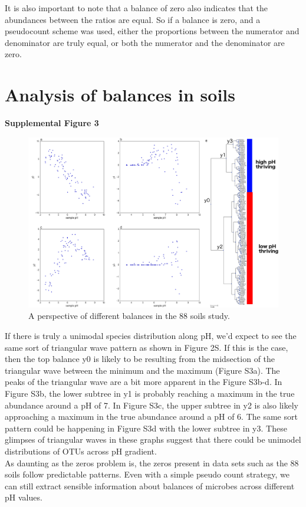 It is also important to note that a balance of zero also indicates that the abundances between the ratios are equal.  So if a balance is zero, and a pseudocount scheme was used, either the proportions between the numerator and denominator are truly equal, or both the numerator and the denominator are zero.\newpage
\section{Analysis of balances in soils}
\textbf{Supplemental Figure 3}\\[5 mm]
\begin{figure}[H]
        \centering
        \includegraphics[width=1\textwidth]{appendix_b/sup_figure3.png}
        \caption[Other balances from the 88 soils study.]{A perspective of different balances in the 88 soils study.}
        \label{figbS3}
\end{figure}
If there is truly a unimodal species distribution along pH, we’d expect to see the same sort of triangular wave pattern as shown in Figure 2S.  If this is the case, then the top balance y0 is likely to be resulting from the midsection of the triangular wave between the minimum and the maximum (Figure S3a).  The peaks of the triangular wave are a bit more apparent in the Figure S3b-d.  In Figure S3b, the lower subtree in y1 is probably reaching a maximum in the true abundance around a pH of 7.  In Figure S3c, the upper subtree in y2 is also likely approaching a maximum in the true abundance around a pH of 6.  The same sort pattern could be happening in Figure S3d with the lower subtree in y3.  These glimpses of triangular waves in these graphs suggest that there could be unimodel distributions of OTUs across pH gradient. \\[5 mm]
As daunting as the zeros problem is, the zeros present in data sets such as the 88 soils follow predictable patterns.  Even with a simple pseudo count strategy, we can still extract sensible information about balances of microbes across different pH values.
